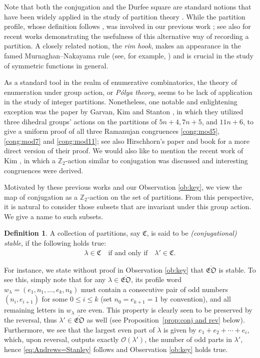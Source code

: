 \documentclass[12pt,reqno]{amsart}
\numberwithin{equation}{section}
\theoremstyle{plain}
\theoremstyle{definition}
\newtheorem{Def}[theorem]{Definition}
\def\Z{\mathbb{Z}}
\def\cO{\mathcal{O}}
\begin{document}
Note that both the conjugation and the Durfee square are standard notions that have been widely applied in
the study of partition theory \cite{and}. While the partition profile, whose definition follows \cite{KN},
was involved in our previous work \cite{FT}; see also \cite{Fu22, LXY22} for recent works demonstrating the
usefulness of this alternative way of recording a partition. A closely related notion, the {\em rim hook},
makes an appearance in the famed Murnaghan--Nakayama rule (see, for example, \cite[Theorem~4.10.2]{sag})
and is crucial in the study of symmetric functions in general.

As a standard tool in the realm of enumerative combinatorics, the theory of enumeration under group action,
or \textit{P\'olya theory}, seems to be lack of application in the study of integer partitions.
Nonetheless, one notable and enlightening exception was the paper by Garvan, Kim and Stanton \cite{GKS},
in which they utilized three dihedral groups' actions on the partitions of $5n+4, 7n+5$, and $11n+6$, to
give a uniform proof of all three Ramanujan congruences \eqref{cong:mod5}, \eqref{cong:mod7} and
\eqref{cong:mod11}; see also Hirschhorn's paper \cite{hir} and book \cite[Chap.~4]{hirb} for a more direct
version of their proof. We would also like to mention the recent work of Kim \cite{kim}, in which a
$\Z_2$-action similar to conjugation was discussed and interesting congruences were derived.

Motivated by these previous works and our Observation \ref{ob:key}, we view the map of conjugation as a
$\Z_2$-action on the set of partitions. From this perspective, it is natural to consider those subsets that
are invariant under this group action. We give a name to such subsets.

\begin{Def}\label{def:stable}
A collection of partitions, say $\mathfrak{C}$, is said to be {\em (conjugational) stable}, if the
following holds true:
\begin{align*}
\lambda\in\mathfrak{C}\quad\textrm{if~and~only~if}\quad\lambda'\in\mathfrak{C}.
\end{align*}
\end{Def}

For instance, we state without proof in Observation \ref{ob:key} that $\overline{\mathfrak{EO}}$ is
stable. To see this, simply note that for any $\lambda\in\overline{\mathfrak{EO}}$, its profile word $w_{\lambda}=(e_1,n_1,\ldots,e_k,n_k)$ must contain a consecutive pair of odd numbers $(n_i,e_{i+1})$ for
some $0\le i\le k$ (set $n_0=e_{k+1}=1$ by convention), and all remaining letters in $w_{\lambda}$ are even.
This property is clearly seen to be preserved by the reversal, thus $\lambda'\in\overline{\mathfrak{EO}}$ as
well (see Proposition~\ref{prop:conj and rev} below). Furthermore, we see that the largest even part of
$\lambda$ is given by $e_1+e_2+\cdots+e_i$, which, upon reversal, outputs exactly $\cO(\lambda')$, the
number of odd parts in $\lambda'$, hence \eqref{eq:Andrews=Stanley} follows and Observation \ref{ob:key}
holds true.
\end{document}

